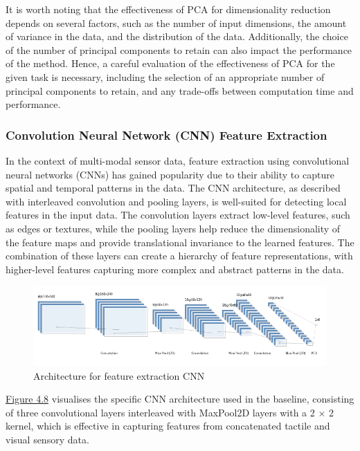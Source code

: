 \documentclass[11pt, a4paper]{report}
\begin{document}
It is worth noting that the effectiveness of PCA for dimensionality reduction depends on several factors, such as the number of input dimensions, the amount of variance in the data, and the distribution of the data. Additionally, the choice of the number of principal components to retain can also impact the performance of the method. Hence, a careful evaluation of the effectiveness of PCA for the given task is necessary, including the selection of an appropriate number of principal components to retain, and any trade-offs between computation time and performance.


\subsubsection{Convolution Neural Network (CNN) Feature Extraction}\label{sec:4.4.2.2}
In the context of multi-modal sensor data, feature extraction using convolutional neural networks (CNNs) has gained popularity due to their ability to capture spatial and temporal patterns in the data. The CNN architecture, as described with interleaved convolution and pooling layers, is well-suited for detecting local features in the input data. The convolution layers extract low-level features, such as edges or textures, while the pooling layers help reduce the dimensionality of the feature maps and provide translational invariance to the learned features. The combination of these layers can create a hierarchy of feature representations, with higher-level features capturing more complex and abstract patterns in the data.

\begin{figure}[H]
    \includegraphics[scale=0.7]{docs/Project Report/Media/nn.png}
    \caption{Architecture for feature extraction CNN}
    \label{fig:4.8}
\end{figure}

\hyperref[fig:4.8]{Figure 4.8} visualises the specific CNN architecture used in the baseline, consisting of three convolutional layers interleaved with MaxPool2D layers with a 2 × 2 kernel, which is effective in capturing features from concatenated tactile and visual sensory data. 
\end{document}
